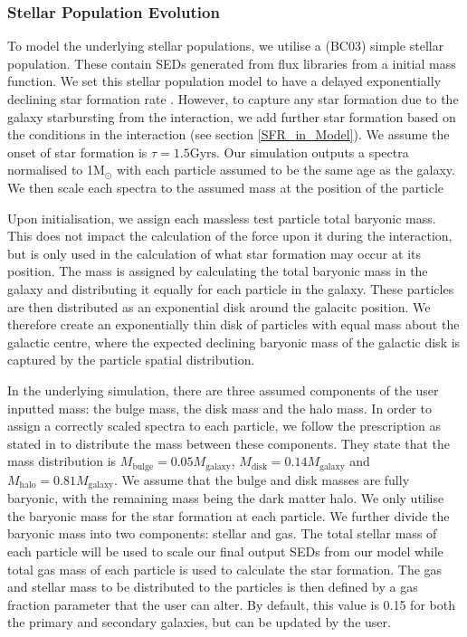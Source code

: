 \subsubsection{Stellar Population Evolution}\label{Stellar_Pop_Evol}
To model the underlying stellar populations, we utilise a \citet{Bruzual_03} (BC03) simple stellar population. These contain SEDs generated from flux libraries from a \citet{Chabrier_03} initial mass function. We set this stellar population model to have a delayed exponentially declining star formation rate \citep{Johansson_09, Pacifici_13,Simha_14, Boquien_18}. However, to capture any star formation due to the galaxy starbursting from the interaction, we add further star formation based on the conditions in the interaction (see section \ref{SFR_in_Model}). We assume the onset of star formation is $\tau = 1.5\text{Gyrs}$. Our simulation outputs a spectra normalised to 1M$_{\odot}$ with each particle assumed to be the same age as the galaxy. We then scale each spectra to the assumed mass at the position of the particle

Upon initialisation, we assign each massless test particle total baryonic mass. This does not impact the calculation of the force upon it during the interaction, but is only used in the calculation of what star formation may occur at its position. The mass is assigned by calculating the total baryonic mass in the galaxy and distributing it equally for each particle in the galaxy. These particles are then distributed as an exponential disk around the galacitc position. We therefore create an exponentially thin disk of particles with equal mass about the galactic centre, where the expected declining baryonic mass of the galactic disk is captured by the particle spatial distribution.

In the underlying simulation, there are three assumed components of the user inputted mass: the bulge mass, the disk mass and the halo mass. In order to assign a correctly scaled spectra to each particle, we follow the prescription as stated in \citet{Wallin_16} to distribute the mass between these components. They state that the mass distribution is $M_{\text{bulge}} = 0.05M_{\text{galaxy}}$, $M_{\text{disk}} = 0.14M_{\text{galaxy}}$ and $M_{\text{halo}} = 0.81M_{\text{galaxy}}$. We assume that the bulge and disk masses are fully baryonic, with the remaining mass being the dark matter halo. We only utilise the baryonic mass for the star formation at each particle. We further divide the baryonic mass into two components: stellar and gas. The total stellar mass of each particle will be used to scale our final output SEDs from our model while total gas mass of each particle is used to calculate the star formation. The gas and stellar mass to be distributed to the particles is then defined by a gas fraction parameter that the user can alter. By default, this value is 0.15 for both the primary and secondary galaxies, but can be updated by the user.

